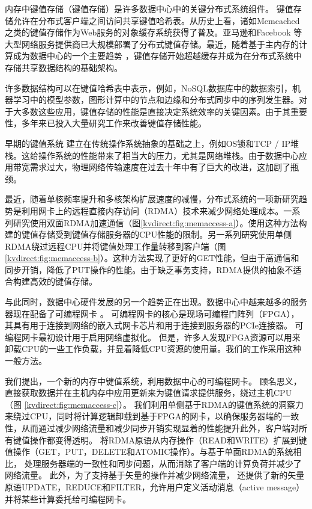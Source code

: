 内存中键值存储（键值存储）是许多数据中心中的关键分布式系统组件。 键值存储允许在分布式客户端之间访问共享键值哈希表。从历史上看，诸如Memcached \cite {fitzpatrick2004distributed}之类的键值存储作为Web服务的对象缓存系统获得了普及。亚马逊\cite {decandia2007dynamo}和Facebook \cite {atikoglu2012workload,nishtala2013scaling}等大型网络服务提供商已大规模部署了分布式键值存储。最近，随着基于主内存的计算成为数据中心的一个主要趋势 \cite{ousterhout2010case,dragojevic2014farm}，键值存储开始超越缓存并成为在分布式系统中存储共享数据结构的基础架构。

许多数据结构可以在键值哈希表中表示，例如，NoSQL数据库中的数据索引\cite {chang2008bigtable}，机器学习中的模型参数\cite {li2014scaling}，图形计算中的节点和边缘\cite {shao2013trinity,xiao17tux2}和分布式同步中的序列发生器\cite {kalia2016design}。对于大多数这些应用，键值存储的性能是直接决定系统效率的关键因素。由于其重要性，多年来已投入大量研究工作来改善键值存储性能。

早期的键值系统\cite {decandia2007dynamo,fitzpatrick2004distributed,nishtala2013scaling} 建立在传统操作系统抽象的基础之上，例如OS锁和TCP / IP堆栈。这给操作系统的性能带来了相当大的压力，尤其是网络堆栈。由于数据中心应用带宽需求过大，物理网络传输速度在过去十年中有了巨大的改进，这加剧了瓶颈。

最近，随着单核频率提升和多核架构扩展速度的减慢，分布式系统的一项新研究趋势是利用网卡上的远程直接内存访问（RDMA）技术来减少网络处理成本。一系列研究\cite {kalia2014using,kalia2016design}使用双面RDMA加速通信（图\ref {kvdirect:fig:memaccess-a}）。使用这种方法构建的键值存储受到键值存储服务器的CPU性能的限制。另一系列研究使用单侧RDMA绕过远程CPU并将键值处理工作量转移到客户端\cite {dragojevic2014farm,mitchell2013using}（图\ref {kvdirect:fig:memaccess-b}）。这种方法实现了更好的GET性能，但由于高通信和同步开销，降低了PUT操作的性能。由于缺乏事务支持，RDMA提供的抽象不适合构建高效的键值存储。

与此同时，数据中心硬件发展的另一个趋势正在出现。数据中心中越来越多的服务器现在配备了可编程网卡 \cite{caulfield2016cloud,greenberg2015sdn,putnam2014reconfigurable}。
可编程网卡的核心是现场可编程门阵列（FPGA），其具有用于连接到网络的嵌入式网卡芯片和用于连接到服务器的PCIe连接器。
可编程网卡最初设计用于启用网络虚拟化\cite {vfp,li2016clicknp}。
但是，许多人发现FPGA资源可以用来卸载CPU的一些工作负载，并显着降低CPU资源的使用量\cite {ouyang14hotchips,MaZC17fpga,huang16socc,cong16dac}。我们的工作采用这种一般方法。

我们提出\oursys{}，一个新的内存中键值系统，利用数据中心的可编程网卡。
顾名思义，\oursys{} 直接获取数据并在主机内存中应用更新来为键值请求提供服务，绕过主机CPU（图 \ref {kvdirect:fig:memaccess-c}）。
我们利用单侧基于RDMA的键值系统的洞察力来绕过CPU，同时将计算逻辑卸载到基于FPGA的网卡，以确保服务器端的一致性，从而通过减少网络流量和减少同步开销实现显着的性能提升此外，客户端对所有键值操作都变得透明。
\oursys{} 将RDMA原语从内存操作（READ和WRITE）扩展到键值操作（GET，PUT，DELETE和ATOMIC操作）。与基于单面RDMA的系统相比，\oursys{} 处理服务器端的一致性和同步问题，从而消除了客户端的计算负荷并减少了网络流量。
此外，为了支持基于矢量的操作并减少网络流量，\oursys{} 还提供了新的矢量原语UPDATE，REDUCE和FILTER，允许用户定义活动消息（active message）\cite {eicken1992active}并将某些计算委托给可编程网卡。


